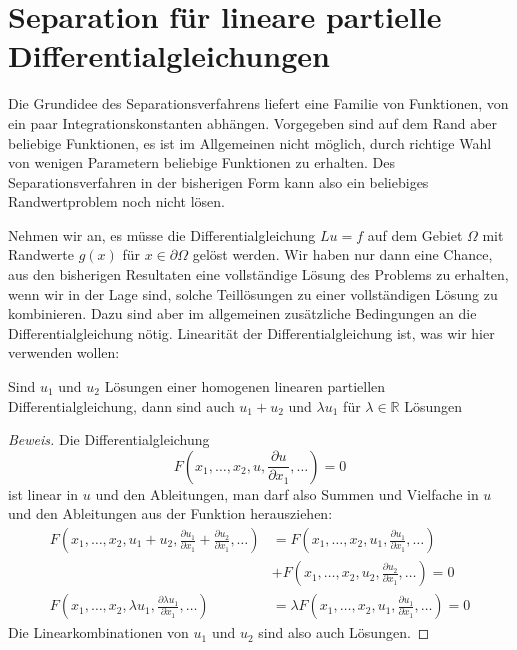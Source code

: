 %
%
%
\section{Separation für lineare partielle Differentialgleichungen}
Die Grundidee des Separationsverfahrens liefert eine Familie von Funktionen,
von ein paar Integrationskonstanten abhängen. Vorgegeben sind auf dem
Rand aber beliebige Funktionen, es ist im Allgemeinen nicht möglich,
durch richtige Wahl von wenigen Parametern beliebige Funktionen zu erhalten.
Des Separationsverfahren in der bisherigen Form kann also ein
beliebiges Randwertproblem noch nicht lösen.

Nehmen wir an, es müsse die Differentialgleichung $Lu=f$ auf dem
Gebiet $\Omega$ mit Randwerte $g(x)$ für $x\in\partial \Omega$
gelöst werden.
Wir haben nur dann eine Chance, aus den bisherigen Resultaten eine 
vollständige Lösung des Problems zu erhalten, wenn wir in der
Lage sind, solche Teillösungen zu einer vollständigen Lösung
zu kombinieren. Dazu sind aber im allgemeinen zusätzliche
Bedingungen an die Differentialgleichung nötig. Linearität der
Differentialgleichung ist, was wir hier verwenden wollen:

\begin{satz}Sind $u_1$ und $u_2$ Lösungen einer homogenen linearen partiellen
Differentialgleichung, dann sind auch $u_1+u_2$ und $\lambda u_1$ für
$\lambda\in\mathbb R$ Lösungen
\end{satz}

\begin{proof}[Beweis]
Die Differentialgleichung
\[
F(x_1,\dots,x_2,u,\frac{\partial u}{\partial x_1},\dots)=0
\]
ist linear in $u$ und den Ableitungen, man darf also Summen und Vielfache
in $u$ und den Ableitungen aus der Funktion herausziehen:
\begin{align*}
F(x_1,\dots,x_2,u_1+u_2,\frac{\partial u_1}{\partial x_1}+\frac{\partial u_2}{\partial x_1},\dots)
&=
F(x_1,\dots,x_2,u_1,\frac{\partial u_1}{\partial x_1},\dots)
\\
&+
F(x_1,\dots,x_2,u_2,\frac{\partial u_2}{\partial x_1},\dots)=0
\\
F(x_1,\dots,x_2,\lambda u_1,\frac{\partial \lambda u_1}{\partial x_1},\dots)
&=
\lambda
F(x_1,\dots,x_2,u_1,\frac{\partial u_1}{\partial x_1},\dots)
=0
\end{align*}
Die Linearkombinationen von $u_1$ und $u_2$ sind also auch Lösungen.
\end{proof}

